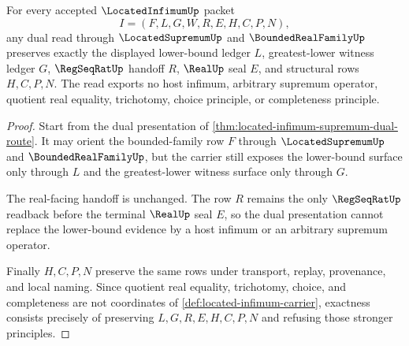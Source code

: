 \begin{theorem}
\label{thm:located-infimum-supremum-dual-exactness}
For every accepted $\LocatedInfimumUp$ packet
$$
I=(F,L,G,W,R,E,H,C,P,N),
$$
any dual read through $\LocatedSupremumUp$ and $\BoundedRealFamilyUp$ preserves exactly the displayed lower-bound ledger $L$, greatest-lower witness ledger $G$, $\RegSeqRatUp$ handoff $R$, $\RealUp$ seal $E$, and structural rows $H,C,P,N$. The read exports no host infimum, arbitrary supremum operator, quotient real equality, trichotomy, choice principle, or completeness principle.
\end{theorem}
\begin{proof}
Start from the dual presentation of \autoref{thm:located-infimum-supremum-dual-route}. It may orient the bounded-family row $F$ through $\LocatedSupremumUp$ and $\BoundedRealFamilyUp$, but the carrier still exposes the lower-bound surface only through $L$ and the greatest-lower witness surface only through $G$.

The real-facing handoff is unchanged. The row $R$ remains the only $\RegSeqRatUp$ readback before the terminal $\RealUp$ seal $E$, so the dual presentation cannot replace the lower-bound evidence by a host infimum or an arbitrary supremum operator.

Finally $H,C,P,N$ preserve the same rows under transport, replay, provenance, and local naming. Since quotient real equality, trichotomy, choice, and completeness are not coordinates of \autoref{def:located-infimum-carrier}, exactness consists precisely of preserving $L,G,R,E,H,C,P,N$ and refusing those stronger principles.
\end{proof}

